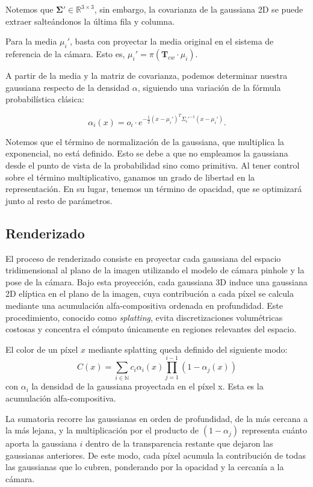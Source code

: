 Notemos que $\boldsymbol{\Sigma}' \in \mathbb{R}^{3\times 3}$, sin embargo, la covarianza de la gaussiana 2D se puede extraer salteándonos la última fila y columna.

Para la media $\mu_i'$, basta con proyectar la media original en el sistema de referencia de la cámara. Esto es,
$\mu_i' = \pi(\mathbf{T}_{cw} \cdot  \mu_i)$.

A partir de la media y la matriz de covarianza, podemos determinar nuestra gaussiana respecto de la densidad $\alpha$, siguiendo una variación de la fórmula probabilística clásica:

\begin{equation}
\alpha_i(x) = o_i \cdot e^{-\frac{1}{2}(x-\mu_i')^T \Sigma_i'^{-1}(x-\mu_i')}.
\end{equation}

Notemos que el término de normalización de la gaussiana, que multiplica la exponencial, no está definido. Esto se debe a que no empleamos la gaussiana desde el punto de vista de la probabilidad sino como primitiva. Al tener control sobre el término multiplicativo, ganamos un grado de libertad en la representación. En su lugar, tenemos un término de opacidad, que se optimizará junto al resto de parámetros.




\subsection{Renderizado}

El proceso de renderizado consiste en proyectar cada gaussiana del espacio tridimensional al plano de la imagen utilizando el modelo de cámara pinhole y la pose de la cámara. Bajo esta proyección, cada gaussiana 3D induce una gaussiana 2D elíptica en el plano de la imagen, cuya contribución a cada píxel se calcula mediante una acumulación alfa-compositiva ordenada en profundidad. Este procedimiento, conocido como \emph{splatting}, evita discretizaciones volumétricas costosas y concentra el cómputo únicamente en regiones relevantes del espacio.

El color de un píxel $x$ mediante splatting queda definido del siguiente modo:
\begin{equation}
C(x) = \sum_{i \in \mathbb{N}} c_i \alpha_i(x) \prod_{j=1}^{i-1} (1-\alpha_j(x))
\end{equation}
con $\alpha_i$ la densidad de la gaussiana proyectada en el píxel x. Esta es la acumulación alfa-compositiva. 

La sumatoria recorre las gaussianas en orden de profundidad, de la más cercana a la más lejana, y la multiplicación por el producto de $(1-\alpha_j)$ representa cuánto aporta la gaussiana $i$ dentro de la transparencia restante que dejaron las gaussianas anteriores. De este modo, cada píxel acumula la contribución de todas las gaussianas que lo cubren, ponderando por la opacidad y la cercanía a la cámara.

